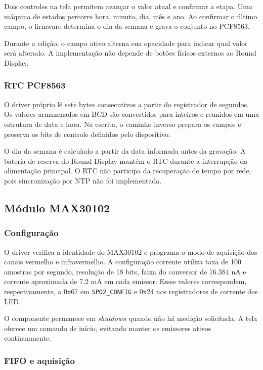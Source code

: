 \documentclass[a4paper,12pt]{article}
\begin{document}
Dois controles na tela permitem avan\c{c}ar o valor atual e confirmar a etapa. Uma m\'aquina de estados percorre hora, minuto, dia, m\^es e ano. Ao confirmar o \'ultimo campo, o firmware determina o dia da semana e grava o conjunto no PCF8563.


Durante a edi\c{c}\~ao, o campo ativo alterna sua opacidade para indicar qual valor ser\'a alterado. A implementa\c{c}\~ao n\~ao depende de bot\~oes f\'isicos externos ao Round Display.


\subsubsection{RTC PCF8563}


O driver pr\'oprio l\^e sete bytes consecutivos a partir do registrador de segundos. Os valores armazenados em BCD s\~ao convertidos para inteiros e reunidos em uma estrutura de data e hora. Na escrita, o caminho inverso prepara os campos e preserva os bits de controle definidos pelo dispositivo.


O dia da semana \'e calculado a partir da data informada antes da grava\c{c}\~ao. A bateria de reserva do Round Display mant\'em o RTC durante a interrup\c{c}\~ao da alimenta\c{c}\~ao principal. O RTC n\~ao participa da recupera\c{c}\~ao de tempo por rede, pois sincroniza\c{c}\~ao por NTP n\~ao foi implementada.


\subsection{M\'odulo MAX30102}


\subsubsection{Configura\c{c}\~ao}


O driver verifica a identidade do MAX30102 e programa o modo de aquisi\c{c}\~ao dos canais vermelho e infravermelho. A configura\c{c}\~ao corrente utiliza taxa de 100 amostras por segundo, resolu\c{c}\~ao de 18 bits, faixa do conversor de 16.384 nA e corrente aproximada de 7,2 mA em cada emissor. Esses valores correspondem, respectivamente, a 0x67 em \texttt{SPO2\_CONFIG} e 0x24 nos registradores de corrente dos LED.


O componente permanece em \emph{shutdown} quando n\~ao h\'a medi\c{c}\~ao solicitada. A tela oferece um comando de in\'icio, evitando manter os emissores ativos continuamente.


\subsubsection{FIFO e aquisi\c{c}\~ao}
\end{document}
